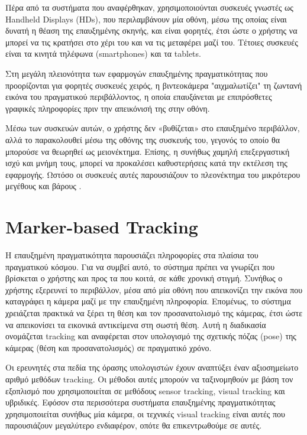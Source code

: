 Πέρα από τα συστήματα που αναφέρθηκαν, χρησιμοποιούνται συσκευές γνωστές ως Handheld Displays (HDs), που περιλαμβάνουν μία οθόνη, μέσω της οποίας είναι δυνατή η θέαση της επαυξημένης σκηνής, και είναι φορητές, έτσι ώστε ο χρήστης να μπορεί να τις κρατήσει στο χέρι του και να τις μεταφέρει μαζί του. Τέτοιες συσκευές είναι τα κινητά τηλέφωνα (smartphones) και τα tablets.

Στη μεγάλη πλειονότητα των εφαρμογών επαυξημένης πραγματικότητας που προορίζονται για φορητές συσκευές χειρός, η βιντεοκάμερα "αιχμαλωτίζει" τη ζωντανή εικόνα του πραγματικού περιβάλλοντος, η οποία επαυξάνεται με επιπρόσθετες γραφικές πληροφορίες πριν την απεικόνισή της στην οθόνη.  


Μέσω των συσκευών αυτών, ο χρήστης δεν «βυθίζεται» στο επαυξημένο περιβάλλον, αλλά το παρακολουθεί μέσω της οθόνης της συσκευής του, γεγονός το οποίο θα μπορούσε να θεωρηθεί ως μειονέκτημα. Επίσης, η συνήθως χαμηλή επεξεργαστική ισχύ και μνήμη τους, μπορεί να προκαλέσει καθυστερήσεις κατά την εκτέλεση της εφαρμογής. Ωστόσο οι συσκευές αυτές παρουσιάζουν το πλεονέκτημα του μικρότερου μεγέθους και βάρους \cite{arth2015history} \cite{wagner2007handheld}  .





\section{Marker-based Tracking}



Η επαυξημένη πραγματικότητα παρουσιάζει πληροφορίες στα πλαίσια του πραγματικού κόσμου. Για να συμβεί αυτό, το σύστημα πρέπει να γνωρίζει που βρίσκεται ο χρήστης και προς τα που κοιτά, σε κάθε χρονική στιγμή. Συνήθως ο χρήστης εξερευνεί το περιβάλλον, μέσα από μία οθόνη που απεικονίζει την εικόνα που καταγράφει η κάμερα μαζί με την επαυξημένη πληροφορία. Επομένως, το σύστημα χρειάζεται πρακτικά να ξέρει τη θέση και τον προσανατολισμό της κάμερας, έτσι ώστε να απεικονίσει τα εικονικά αντικείμενα στη σωστή θέση. Αυτή η διαδικασία ονομάζεται tracking και αναφέρεται στον υπολογισμό της σχετικής πόζας (pose) της κάμερας (θέση και προσανατολισμός) σε πραγματικό χρόνο.


Οι ερευνητές στα πεδία της όρασης υπολογιστών έχουν αναπτύξει έναν αξιοσημείωτο αριθμό μεθόδων tracking. Οι μέθοδοι αυτές μπορούν να ταξινομηθούν με βάση τον εξοπλισμό που χρησιμοποιείται σε μεθόδους sensor tracking, visual tracking και υβριδικές. Εφόσον στα περισσότερα συστήματα επαυξημένης πραγματικότητας χρησιμοποιείται συνήθως μία κάμερα, οι τεχνικές visual tracking είναι αυτές που παρουσιάζουν μεγαλύτερο ενδιαφέρον, οπότε θα επικεντρωθούμε σε αυτές.


